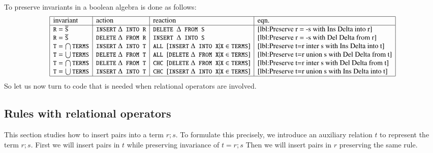 \documentclass{elsarticle}
\begin{document}
% 
	To preserve invariants in a boolean algebra is done as follows:
\[\begin{array}{|l|l|l|l|}
\hline
\text{invariant}&\text{action}&\text{reaction}&\text{eqn.}\\ \hline
\code{R}=\cmpl{\code{S}}&\code{INSERT}\ \Delta\code{ INTO R}&\code{DELETE }\Delta\code{ FROM S}&\ref{lbl:Preserve r = -s with Ins Delta into r}\\
\code{R}=\cmpl{\code{S}}&\code{DELETE}\ \Delta\code{ FROM R}&\code{INSERT }\Delta\code{ INTO S}&\ref{lbl:Preserve r = -s with Del Delta from r}\\
\code{T}=\bigcap\code{TERMS}&\code{INSERT}\ \Delta\code{ INTO T}&\code{ALL }[\code{INSERT}\ \Delta\code{ INTO X}|\code{X}\in\code{TERMS}]&\ref{lbl:Preserve t=r inter s with Ins Delta into t}\\
\code{T}=\bigcup\code{TERMS}&\code{DELETE}\ \Delta\code{ FROM T}&\code{ALL }[\code{DELETE}\ \Delta\code{ FROM X}|\code{X}\in\code{TERMS}]&\ref{lbl:Preserve t=r union s with Del Delta from t}\\
\code{T}=\bigcap\code{TERMS}&\code{DELETE}\ \Delta\code{ FROM T}&\code{CHC }[\code{DELETE}\ \Delta\code{ FROM X}|\code{X}\in\code{TERMS}]&\ref{lbl:Preserve t=r inter s with Del Delta from t}\\
\code{T}=\bigcup\code{TERMS}&\code{INSERT}\ \Delta\code{ INTO T}&\code{CHC }[\code{INSERT}\ \Delta\code{ INTO X}|\code{X}\in\code{TERMS}]&\ref{lbl:Preserve t=r union s with Ins Delta into t}\\ \hline
\end{array}\]
	So let us now turn to code that is needed when relational operators are involved.

\subsection{Rules with relational operators}
	This section studies how to insert pairs into a term $r;s$.
	To formulate this precisely, we introduce an auxiliary relation $t$ to represent the term $r;s$.
	First we will insert pairs in $t$ while preserving invariance of $t=r;s$
	Then we will insert pairs in $r$ preserving the same rule.
\end{document}
